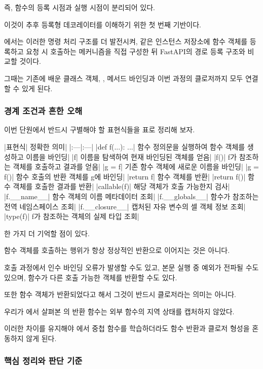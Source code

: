즉, 함수의 등록 시점과 실행 시점이 분리되어 있다.

이것이 추후 등록형 데코레이터를 이해하기 위한 첫 번째 기반이다.

에서는 이러한 명령 처리 구조를 더 발전시켜,  같은 인스턴스 저장소에 함수 객체를 등록하고 요청 시 호출하는 메커니즘을 직접 구성한 뒤 FastAPI의 경로 등록 구조와 비교할 것이다.

그때는 기존에 배운 클래스 객체, , 메서드 바인딩과 이번 과정의 클로저까지 모두 연결할 수 있게 된다.

\subsubsection{경계 조건과 흔한 오해}

이번 단원에서 반드시 구별해야 할 표현식들을 표로 정리해 보자.

\begin{dhktable}
|표현식|	정확한 의미|
|:---|:---|
|def f(...): ...|	함수 정의문을 실행하여 함수 객체를 생성하고 이름을 바인딩|
|f|	이름을 탐색하여 현재 바인딩된 객체를 얻음|
|f()|	f가 참조하는 객체를 호출하고 결과를 얻음|
|g = f|	기존 함수 객체에 새로운 이름을 바인딩|
|g = f()|	함수 호출의 반환 객체를 g에 바인딩|
|return f|	함수 객체를 반환|
|return f()|	함수 객체를 호출한 결과를 반환|
|callable(f)|	해당 객체가 호출 가능한지 검사|
|f.__name__|	함수 객체의 이름 메타데이터 조회|
|f.__globals__|	함수가 참조하는 전역 네임스페이스 조회|
|f.__closure__|	캡처된 자유 변수의 셀 객체 정보 조회|
|type(f)|	f가 참조하는 객체의 실제 타입 조회|
\end{dhktable}

한 가지 더 기억할 점이 있다.

함수 객체를 호출하는 행위가 항상 정상적인 반환으로 이어지는 것은 아니다.

호출 과정에서 인수 바인딩 오류가 발생할 수도 있고, 본문 실행 중 예외가 전파될 수도 있으며, 함수가 다른 호출 가능한 객체를 반환할 수도 있다.

또한 함수 객체가 반환되었다고 해서 그것이 반드시 클로저라는 의미는 아니다.

우리가 에서 살펴본 의 반환 함수는 외부 함수의 지역 상태를 캡처하지 않았다.

이러한 차이를 유지해야 에서 중첩 함수를 학습하더라도 함수 반환과 클로저 형성을 혼동하지 않게 된다.

\subsubsection{핵심 정리와 판단 기준}

